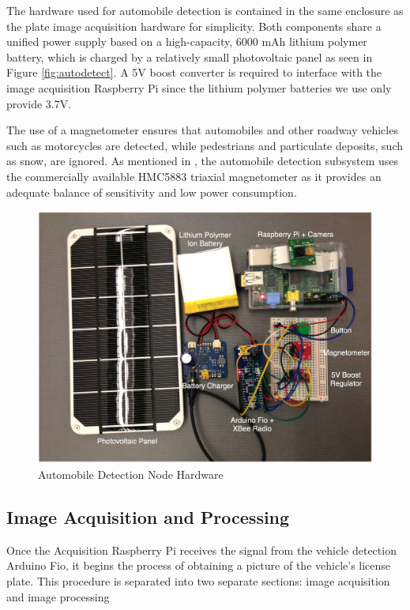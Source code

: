 \documentclass[11pt, oneside, fullpage, doublespace]{article}
\begin{document}
The hardware used for automobile detection is contained in the same enclosure as the plate image acquisition hardware for simplicity. Both components share a unified power supply based on a high-capacity, 6000 mAh lithium polymer battery, which is charged by a relatively small photovoltaic panel as seen in Figure \ref{fig:autodetect}. A 5V boost converter is required to interface with the image acquisition Raspberry Pi since the lithium polymer batteries we use only provide 3.7V.

The use of a magnetometer ensures that automobiles and other roadway vehicles such as motorcycles are detected, while pedestrians and particulate deposits, such as snow, are ignored. As mentioned in \cite{stillwell2013}, the automobile detection subsystem uses the commercially available HMC5883 triaxial magnetometer as it provides an adequate balance of sensitivity and low power consumption.

\begin{figure}
\begin{center}
\includegraphics[width=4.5in]{sensornode}
\end{center}
\caption{Automobile Detection Node Hardware}
\label{fig:autodetecthardware}
\end{figure}

\subsection{Image Acquisition and Processing}
Once the Acquisition Raspberry Pi receives the signal from the vehicle detection Arduino Fio, it begins the process of obtaining a picture of the vehicle's license plate. This procedure is separated into two separate sections: image acquisition and image processing
\end{document}
